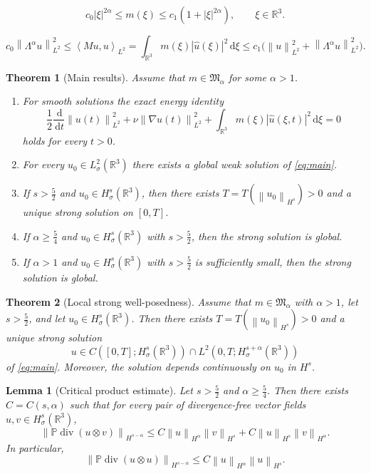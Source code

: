 \documentclass[10pt,a4paper]{amsart}
\newtheorem{theorem}{Theorem}
\newtheorem{lemma}{Lemma}
\newcommand{\Pcal}{\mathbb{P}}
\newcommand{\R}{\mathbb{R}}
\newcommand{\abs}[1]{\left\lvert #1\right\rvert}
\newcommand{\dd}{\,\mathrm{d}}
\newcommand{\diver}{\operatorname{div}}
\newcommand{\ip}[2]{\left\langle #1,#2\right\rangle}
\newcommand{\norm}[1]{\left\lVert #1\right\rVert}
\begin{document}
\begin{equation}\label{eq:symbol-growth}
c_0 |\xi|^{2\alpha} \le m(\xi) \le c_1 (1+|\xi|^{2\alpha}),
\qquad \xi\in\R^3.
\end{equation}

\begin{equation}\label{eq:coercive-equivalence}
c_0 \norm{\Lambda^\alpha u}_{L^2}^2
\le
\ip{M u}{u}_{L^2}
=
\int_{\R^3} m(\xi)\abs{\hat u(\xi)}^2 \dd \xi
\le
c_1 \bigl(\norm{u}_{L^2}^2 + \norm{\Lambda^\alpha u}_{L^2}^2\bigr).
\end{equation}

\begin{theorem}[Main results]\label{thm:main}
Assume that $m\in\mathfrak M_\alpha$ for some $\alpha>1$.
\begin{enumerate}[label=(\roman*)]
\item For smooth solutions the exact energy identity
\[
\frac12 \frac{\dd}{\dd t}\norm{u(t)}_{L^2}^2
+
\nu \norm{\nabla u(t)}_{L^2}^2
+
\int_{\R^3} m(\xi)\abs{\hat u(\xi,t)}^2 \dd \xi
=0
\]
holds for every $t>0$.
\item For every $u_0\in L^2_\sigma(\R^3)$ there exists a global weak solution of \eqref{eq:main}.
\item If $s>\frac52$ and $u_0\in H^s_\sigma(\R^3)$, then there exists $T=T(\norm{u_0}_{H^s})>0$ and a unique strong solution on $[0,T]$.
\item If $\alpha\ge \frac54$ and $u_0\in H^s_\sigma(\R^3)$ with $s>\frac52$, then the strong solution is global.
\item If $\alpha>1$ and $u_0\in H^s_\sigma(\R^3)$ with $s>\frac52$ is sufficiently small, then the strong solution is global.
\end{enumerate}
\end{theorem}

\begin{theorem}[Local strong well-posedness]\label{thm:local}
Assume that $m\in\mathfrak M_\alpha$ with $\alpha>1$, let $s>\frac52$, and let $u_0\in H^s_\sigma(\R^3)$. Then there exists $T=T(\norm{u_0}_{H^s})>0$ and a unique strong solution
\[
u\in C([0,T];H^s_\sigma(\R^3))\cap L^2(0,T;H^{s+\alpha}_\sigma(\R^3))
\]
of \eqref{eq:main}. Moreover, the solution depends continuously on $u_0$ in $H^s$.
\end{theorem}

\begin{lemma}[Critical product estimate]\label{lem:critical-product}
Let $s>\frac52$ and $\alpha\ge \frac54$. Then there exists $C=C(s,\alpha)$ such that for every pair of divergence-free vector fields $u,v\in H^s_\sigma(\R^3)$,
\begin{equation}\label{eq:critical-product}
\norm{\Pcal\diver(u\otimes v)}_{H^{s-\alpha}}
\le C\norm{u}_{H^\alpha}\norm{v}_{H^s} + C\norm{u}_{H^s}\norm{v}_{H^\alpha}.
\end{equation}
In particular,
\begin{equation}\label{eq:critical-product-diagonal}
\norm{\Pcal\diver(u\otimes u)}_{H^{s-\alpha}}
\le C\norm{u}_{H^\alpha}\norm{u}_{H^s}.
\end{equation}
\end{lemma}
\end{document}
